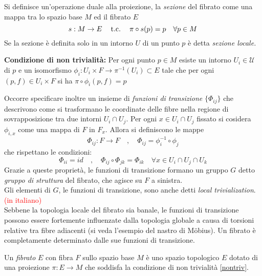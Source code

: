 Si definisce un'operazione duale alla proiezione, la \emph{sezione} del fibrato
come una mappa tra lo spazio base $M$ ed il fibrato $E$
\begin{equation}\label{def:section}
   s : M \to E \quad \mathrm{\: t.c. \:} \quad \pi \circ s (p) = p \quad \forall p \in M
\end{equation}
Se la sezione è definita solo in un intorno $U$ di un punto $p$ è detta \emph{sezione locale.}


\begin{axiom}\textbf{Condizione di non trivialità:} \label{nontriv}
      Per ogni punto $p \in M$ esiste un intorno $U_i \in \mathcal{U}$ di $p$ e un isomorfismo
      $\phi_i : U_i \times F \to \pi^{-1}(U_i) \subset E$ tale che per ogni
      $(p,f) \in U_i \times F$ si ha $\pi \circ \phi_i(p,f) = p$
\end{axiom}

Occorre specificare inoltre un insieme di \emph{funzioni di transizione} $\{\Phi_{ij}\}$ che
descrivono come si trasformano le coordinate delle fibre nella regione di
sovrapposizione tra due intorni $U_i \cap U_j$. Per ogni $x \in U_i \cap U_j$ fissato si
cosidera $\phi_{i,x}$ come una mappa di $F$ in $F_x$.
Allora si definiscono le mappe
\begin{equation}\label{eq:transfunctions}
   \Phi_{ij} : F \to F \quad , \quad \Phi_{ij} = \phi_i^{-1} \circ\phi_j
\end{equation}
che rispettano le condizioni:
\begin{equation}
   \Phi_{ii} = id \quad , \quad \Phi_{ij} \circ \Phi_{jk} = \Phi_{ik}
   \quad \forall x \in U_i \cap U_j \cap U_k
\end{equation}
Grazie a queste proprietà, le funzioni di transizione formano un gruppo $G$ detto
\emph{gruppo di struttura} del fibrato, che agisce su $F$ a sinistra.\\
Gli elementi di $G$, le funzioni di transizione, sono anche detti
\emph{local trivialization}. \textcolor{red}{(in italiano)}\\

Sebbene la topologia locale del fibrato sia banale, le funzioni di transizione
possono essere fortemente influenzate dalla topologia globale a causa di torsioni
relative tra fibre adiacenti (si veda l'esempio del nastro di Möbius). Un fibrato
è completamente determinato dalle sue funzioni di transizione.\\

\begin{definition}
   Un \emph{fibrato} $E$ con fibra $F$ sullo spazio base $M$ è uno spazio topologico
   $E$ dotato di una proiezione $\pi : E \to M$ che soddisfa la condizione di
   non trivialità \ref{nontriv}.
\end{definition}

